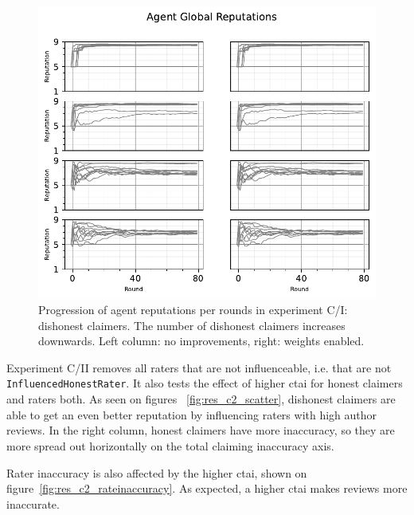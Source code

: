 \documentclass[%
    ]{\PathToTumTemplate/thesis/tum_thesis}
\begin{document}
\begin{figure}[tbp]
  \begin{center}
        \includegraphics[width=0.75\linewidth]	{../results/c/ReputationsPerRounds_joined.pdf}
    \caption{
 	Progression of agent reputations per rounds in experiment C/I: dishonest claimers.
    The number of dishonest claimers increases downwards.
    Left column: no improvements, right: weights enabled.
    }
    \label{fig:res_c_reps}
  \end{center}
\end{figure}

Experiment C/II removes all raters that are not influenceable, i.e. that are not \texttt{InfluencedHonestRater}.
It also tests the effect of higher \gls{ctai} for honest claimers and raters both.
As seen on figures ~\ref{fig:res_c2_scatter}, dishonest claimers are able to get an even better reputation by influencing raters with high author reviews.
In the right column, honest claimers have more inaccuracy, so they are more spread out horizontally on the total claiming inaccuracy axis.

Rater inaccuracy is also affected by the higher \gls{ctai}, shown on figure~\ref{fig:res_c2_rateinaccuracy}.
As expected, a higher \gls{ctai} makes reviews more inaccurate.
\end{document}
